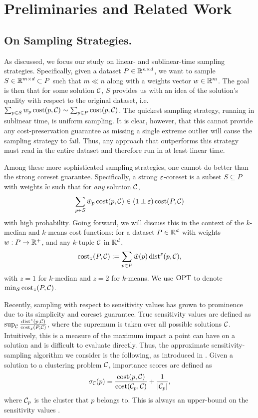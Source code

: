 \section{Preliminaries and Related Work}

\subsection{On Sampling Strategies.}
\label{ssec:sens_sampling}

As discussed, we focus our study on linear- and sublinear-time sampling strategies. Specifically, given a dataset $P \in \mathbb{R}^{n \times d}$, we want to sample $S
\in \mathbb{R}^{m \times d} \subset P$ such that $m \ll n$ along with a weights vector $w \in \mathbb{R}^m$. The goal is then that for some solution $\mathcal C$, $S$
provides us with an idea of the solution's quality with respect to the original dataset, i.e. $\sum_{p \in S} w_p \operatorname{cost}(p, \mathcal C) \sim \sum_{p \in P} \operatorname{cost}(p,
\mathcal C)$. 
The quickest sampling strategy, running in sublinear time, is uniform sampling. It is clear, however, that this cannot provide any cost-preservation guarantee
as missing a single extreme outlier will cause the sampling strategy to fail. Thus, any approach that outperforms this strategy must read in the entire dataset
and therefore run in at least linear time. 

Among these more sophisticated sampling strategies, one cannot do better than the strong coreset guarantee. Specifically, a strong $\varepsilon$-coreset is a subset $S
\subseteq P$ with weights $\tilde w$ such that for \emph{any} solution $\mathcal C$, \[\sum_{p \in S} \tilde w_p \operatorname{cost}(p, \mathcal C) \in (1 \pm \varepsilon) \operatorname{cost}(P, \mathcal C)\] with
high probability.  Going forward, we will discuss this in the context of the $k$-median and $k$-means cost functions: for a dataset $P \in \mathbb{R}^d$ with weights $w
: P \rightarrow \mathbb{R}^+$, and any $k$-tuple $\mathcal C$ in $\mathbb{R}^d$, \[\operatorname{cost}_z(P, \mathcal C) := \sum_{p \in P} \tilde w(p) \operatorname{dist}^z(p, \mathcal C),\] with
$z=1$ for $k$-median and $z=2$ for $k$-means. We use $\text{OPT}$ to denote $\min_{\mathcal S} \operatorname{cost}_z(P, \mathcal C)$.

Recently, sampling with respect to sensitivity values has grown to prominence due to its simplicity and coreset guarantee.  True sensitivity values are defined
as $\sup_{\mathcal C} \frac{\operatorname{dist}^z(p, \mathcal C)}{\operatorname{cost}_z(P, \mathcal C)}$, where the supremum is taken over all possible solutions $\mathcal C$. Intuitively, this is a measure
of the maximum impact a point can have on a solution and is difficult to evaluate directly.
Thus, the approximate sensitivity-sampling algorithm we consider is the following, as introduced in \cite{FeldmanL11}.
Given a solution to a clustering problem $\mathcal C$, importance scores are defined as
\begin{equation}
\label{eq:sensitivity}
\sigma_\mathcal C(p) = \dfrac{\operatorname{cost}(p, \mathcal C)}{\operatorname{cost}(\mathcal C_{p}, \mathcal C)} + \dfrac{1}{|\mathcal C_p|},
\end{equation}
where $\mathcal C_p$ is the cluster that $p$ belongs to. This is always an upper-bound on the sensitivity values .

